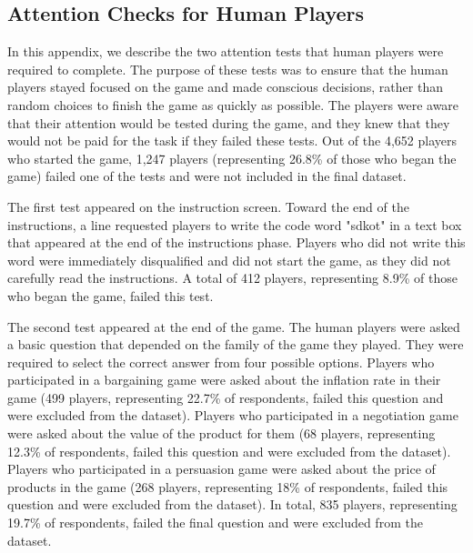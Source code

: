 

\subsection{Attention Checks for Human Players}
\label{app:attention_test}
In this appendix, we describe the two attention tests that human players were required to complete. The purpose of these tests was to ensure that the human players stayed focused on the game and made conscious decisions, rather than random choices to finish the game as quickly as possible. The players were aware that their attention would be tested during the game, and they knew that they would not be paid for the task if they failed these tests. Out of the 4,652 players who started the game, 1,247 players (representing 26.8\% of those who began the game) failed one of the tests and were not included in the final dataset.

The first test appeared on the instruction screen. Toward the end of the instructions, a line requested players to write the code word "sdkot" in a text box that appeared at the end of the instructions phase. Players who did not write this word were immediately disqualified and did not start the game, as they did not carefully read the instructions. A total of 412 players, representing 8.9\% of those who began the game, failed this test.

The second test appeared at the end of the game. The human players were asked a basic question that depended on the family of the game they played. They were required to select the correct answer from four possible options. Players who participated in a bargaining game were asked about the inflation rate in their game (499 players, representing 22.7\% of respondents, failed this question and were excluded from the dataset). Players who participated in a negotiation game were asked about the value of the product for them (68 players, representing 12.3\% of respondents, failed this question and were excluded from the dataset). Players who participated in a persuasion game were asked about the price of products in the game (268 players, representing 18\% of respondents, failed this question and were excluded from the dataset). In total, 835 players, representing 19.7\% of respondents, failed the final question and were excluded from the dataset.
